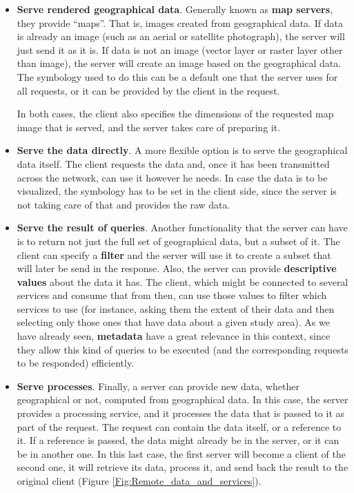 \begin{itemize}
\item \textbf{Serve rendered geographical data}. Generally known as \textbf{map servers}, they provide ``maps''. That is, images created from geographical data. If data is already an image (such as an aerial or satellite photograph), the server will just send it as it is. If data is not an image (vector layer or raster layer other than image), the server will create an image based on the geographical data. The symbology used to do this can be a default one that the server uses for all requests, or it can be provided by the client in the request. 

In both cases, the client also specifies the dimensions of the requested map image that is served, and the server takes care of preparing it.


\item \textbf{Serve the data directly}. A more flexible option is to serve the geographical data itself. The client requests the data and, once it has been transmitted across the network, can use it however he needs. In case the data is to be visualized, the symbology has to be set in the client side, since the server is not taking care of that and provides the raw data.


\item \textbf{Serve the result of queries}. Another functionality that the server can have is to return not just the full set of geographical data, but a subset of it. The client can specify a \textbf{filter} and the server will use it to create a subset that will later be send in the response. Also, the server can provide \textbf{descriptive values} about the data it has. The client, which might be connected to several services and consume that from then, can use those values to filter which services to use (for instance, asking them the extent of their data and then selecting only those ones that have data about a given study area). As we have already seen, \textbf{metadata} have a great relevance in this context, since they allow this kind of queries to be executed (and the corresponding requests to be responded) efficiently.

\item \textbf{Serve processes}. Finally, a server can provide new data, whether geographical or not, computed from geographical data. In this case, the server provides a processing service, and it processes the data that is passed to it as part of the request. The request can contain the data itself, or a reference to it. If a reference is passed, the data might already be in the server, or it can be in another one. In this last case, the first server will become a client of the second one, it will retrieve its data, process it, and send back the result to the original client (Figure \ref{Fig:Remote_data_and_services}).



\end{itemize}
